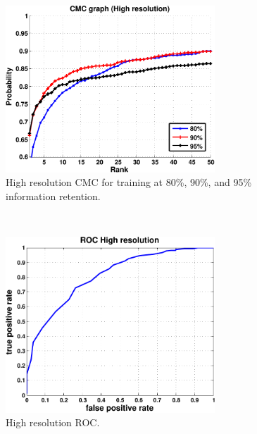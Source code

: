 ~\vfill

\vfill

~\vfill

\begin{figure}[hbt]
  \centering
  \includegraphics[width=0.7\textwidth]{../results/Output_H.pdf}
  \caption{High resolution CMC for training at 80\%, 90\%, and 95\% information retention.}
  \label{fig:cfc_h}
\end{figure}

~\vfill

\begin{figure}[hbt]
  \centering
  \includegraphics[width=0.7\textwidth]{../results/ROC_H.pdf}
  \caption{High resolution ROC.}
  \label{fig:roc_h}
\end{figure}

~\vfill

\vfill

~\vfill

